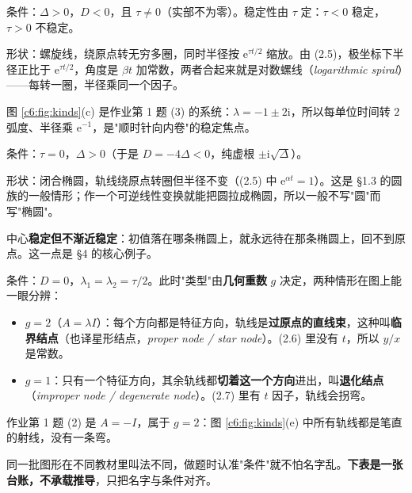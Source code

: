\documentclass[11pt]{ctexart}
\newcommand{\EN}[1]{\textcolor{inkgray}{\itshape #1}}
\begin{document}

条件：$\Delta>0$，$D<0$，且 $\tau\neq0$（实部不为零）。稳定性由 $\tau$ 定：$\tau<0$ 稳定，$\tau>0$ 不稳定。

形状：螺旋线，绕原点转无穷多圈，同时半径按 $\mathrm{e}^{\tau t/2}$ 缩放。由 (2.5)，极坐标下半径正比于 $\mathrm{e}^{\tau t/2}$，角度是 $\beta t$ 加常数，两者合起来就是对数螺线（\EN{logarithmic spiral}）——每转一圈，半径乘同一个因子。

图 \ref{c6:fig:kinds}(c) 是作业第 1 题 (3) 的系统：$\lambda=-1\pm2\mathrm{i}$，所以每单位时间转 $2$ 弧度、半径乘 $\mathrm{e}^{-1}$，是"顺时针向内卷"的稳定焦点。


条件：$\tau=0$，$\Delta>0$（于是 $D=-4\Delta<0$，纯虚根 $\pm\mathrm{i}\sqrt{\Delta}$）。

形状：闭合椭圆，轨线绕原点转圈但半径不变（(2.5) 中 $\mathrm{e}^{\alpha t}=1$）。这是 §1.3 的圆族的一般情形；作一个可逆线性变换就能把圆拉成椭圆，所以一般不写"圆"而写"椭圆"。

中心\textbf{稳定但不渐近稳定}：初值落在哪条椭圆上，就永远待在那条椭圆上，回不到原点。这一点是 §4 的核心例子。


条件：$D=0$，$\lambda_1=\lambda_2=\tau/2$。此时"类型"由\textbf{几何重数} $g$ 决定，两种情形在图上能一眼分辨：

\begin{itemize}
\item $g=2$（$A=\lambda I$）：每个方向都是特征方向，轨线是\textbf{过原点的直线束}，这种叫\textbf{临界结点}（也译星形结点，\EN{proper node / star node}）。(2.6) 里没有 $t$，所以 $y/x$ 是常数。
\item $g=1$：只有一个特征方向，其余轨线都\textbf{切着这一个方向}进出，叫\textbf{退化结点}（\EN{improper node / degenerate node}）。(2.7) 里有 $t$ 因子，轨线会拐弯。
\end{itemize}

作业第 1 题 (2) 是 $A=-I$，属于 $g=2$：图 \ref{c6:fig:kinds}(e) 中所有轨线都是笔直的射线，没有一条弯。


同一批图形在不同教材里叫法不同，做题时认准"条件"就不怕名字乱。\textbf{下表是一张台账，不承载推导}，只把名字与条件对齐。
\end{document}
